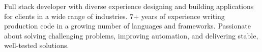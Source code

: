 

\begin{cvparagraph}

Full stack developer with diverse experience designing and building applications for clients in a wide range of industries. 7+ years of experience writing production code in a growing number of languages and frameworks. Passionate about solving challenging problems, improving \newline automation, and delivering stable, well-tested solutions.
\end{cvparagraph}
